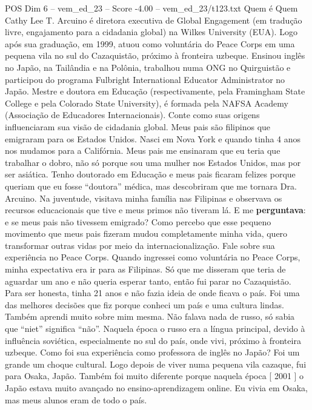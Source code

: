 \begin{textsample}{POS Dim 6 – vem\_ed\_23 – Score -4.00 – vem\_ed\_23/t123.txt}  \label{ex:f6_pos_131}
Quem é Quem Cathy Lee T.
Arcuino é diretora executiva de Global Engagement (em tradução livre, engajamento para a cidadania global) na Wilkes University (EUA).
Logo após sua graduação, em 1999, atuou como voluntária do Peace Corps em uma pequena vila no sul do Cazaquistão, próximo à fronteira uzbeque.
Ensinou inglês no Japão, na Tailândia e na Polônia, trabalhou numa ONG no Quirguistão e participou do programa Fulbright International Educator Administrator no Japão.
Mestre e doutora em Educação (respectivamente, pela Framingham State College e pela Colorado State University), é formada pela NAFSA Academy (Associação de Educadores Internacionais).
Conte como suas origens influenciaram sua visão de cidadania global.
Meus pais são filipinos que emigraram para os Estados Unidos.
Nasci em Nova York e quando tinha 4 anos nos mudamos para a Califórnia.
Meus pais me ensinaram que eu teria que trabalhar o dobro, não só porque sou uma mulher nos Estados Unidos, mas por ser asiática.
Tenho doutorado em Educação e meus pais ficaram felizes porque queriam que eu fosse “doutora” médica, mas descobriram que me tornara Dra.
Arcuino.
Na juventude, visitava minha família nas Filipinas e observava os recursos educacionais que tive e meus primos não tiveram lá.
E me \textbf{perguntava}: e se meus pais não tivessem emigrado?
Como percebo que esse pequeno movimento que meus pais fizeram mudou completamente minha vida, quero transformar outras vidas por meio da internacionalização.
Fale sobre sua experiência no Peace Corps.
Quando ingressei como voluntária no Peace Corps, minha expectativa era ir para as Filipinas.
Só que me disseram que teria de aguardar um ano e não queria esperar tanto, então fui parar no Cazaquistão.
Para ser honesta, tinha 21 anos e não fazia ideia de onde ficava o país.
Foi uma das melhores decisões que fiz porque conheci um país e uma cultura lindas.
Também aprendi muito sobre mim mesma.
Não falava nada de russo, só sabia que “niet” significa “não”.
Naquela época o russo era a língua principal, devido à influência soviética, especialmente no sul do país, onde vivi, próximo à fronteira uzbeque.
Como foi sua experiência como professora de inglês no Japão?
Foi um grande um choque cultural.
Logo depois de viver numa pequena vila cazaque, fui para Osaka, Japão.
Também foi muito diferente porque naquela época [ 2001 ] o Japão estava muito avançado no ensino-aprendizagem online.
Eu vivia em Osaka, mas meus alunos eram de todo o país.

\end{textsample}
